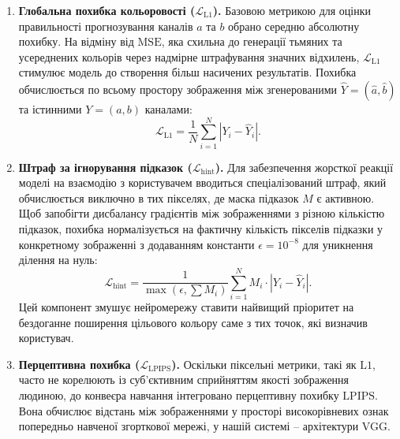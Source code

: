             \begin{enumerate}
                \item \textbf{Глобальна похибка кольоровості ($\mathcal{L}_{\mathrm{L1}}$).}
                Базовою метрикою для оцінки правильності прогнозування каналів $a$ та $b$ обрано середню абсолютну похибку.
                На відміну від $\mathrm{MSE}$, яка схильна до генерації тьмяних та усереднених кольорів через надмірне штрафування значних відхилень, $\mathcal{L}_{\mathrm{L1}}$ стимулює модель до створення більш насичених результатів.
                Похибка обчислюється по всьому простору зображення між згенерованими $\hat{Y} = (\hat{a}, \hat{b})$ та істинними $Y = (a, b)$ каналами:
                \begin{equation*}
                    \mathcal{L}_{\mathrm{L1}} = \frac{1}{N} \sum_{i=1}^{N} | Y_i - \hat{Y}_i |.
                \end{equation*}

                \item \textbf{Штраф за ігнорування підказок ($\mathcal{L}_{\mathrm{hint}}$).}
                Для забезпечення жорсткої реакції моделі на взаємодію з користувачем вводиться спеціалізований штраф, який обчислюється виключно в тих пікселях, де маска підказок $M$ є активною.
                Щоб запобігти дисбалансу градієнтів між зображеннями з різною кількістю підказок, похибка нормалізується на фактичну кількість пікселів підказки у конкретному зображенні з додаванням константи $\epsilon = 10^{-8}$ для уникнення ділення на нуль:
                \begin{equation*}
                    \mathcal{L}_{\mathrm{hint}} = \frac{1}{\max\left(\epsilon, \sum M_i\right)} \sum_{i=1}^{N} M_i \cdot | Y_i - \hat{Y}_i |.
                \end{equation*}
                Цей компонент змушує нейромережу ставити найвищий пріоритет на бездоганне поширення цільового кольору саме з тих точок, які визначив користувач.

                \item \textbf{Перцептивна похибка ($\mathcal{L}_{\mathrm{LPIPS}}$).}
                Оскільки піксельні метрики, такі як $\mathrm{L1}$, часто не корелюють із суб'єктивним сприйняттям якості зображення людиною,
                до конвеєра навчання інтегровано перцептивну похибку $\mathrm{LPIPS}$.
                Вона обчислює відстань між зображеннями у просторі високорівневих ознак попередньо навченої згорткової мережі, у нашій системі -- архітектури VGG.
                

\end{enumerate}

